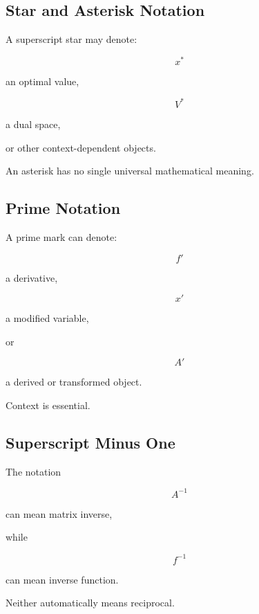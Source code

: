 \subsection{Star and Asterisk Notation}
\label{subsec:star-notation-reference}

A superscript star may denote:

\[
\boxed{
x^*
}
\]

an optimal value,

\[
\boxed{
V^*
}
\]

a dual space,

or other context-dependent objects.

An asterisk has no single universal mathematical meaning.

\subsection{Prime Notation}
\label{subsec:prime-notation-reference}

A prime mark can denote:

\[
\boxed{
f'
}
\]

a derivative,

\[
\boxed{
x'
}
\]

a modified variable,

or

\[
\boxed{
A'
}
\]

a derived or transformed object.

Context is essential.

\subsection{Superscript Minus One}
\label{subsec:superscript-minus-one-reference}

The notation

\[
\boxed{
A^{-1}
}
\]

can mean matrix inverse,

while

\[
\boxed{
f^{-1}
}
\]

can mean inverse function.

Neither automatically means reciprocal.

